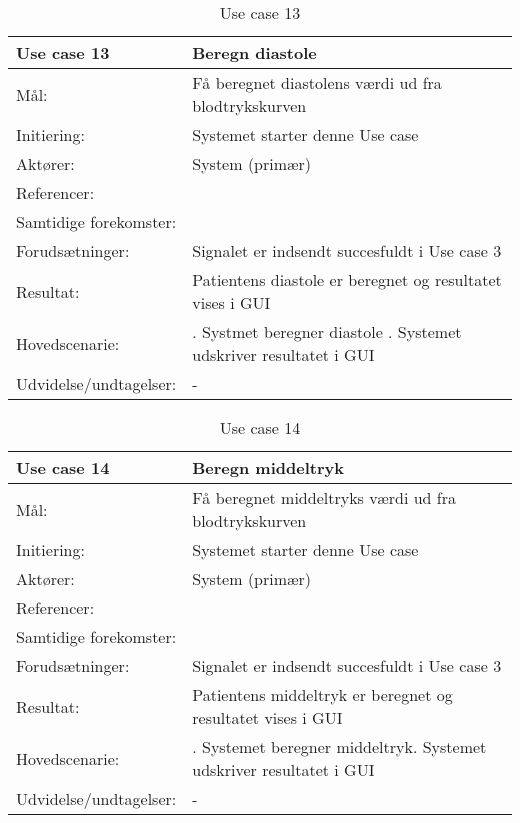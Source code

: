 \begin{table}[h!]
\caption{Use case 13}\label{tab:tabel3}
\begin{tabular}{| l | >{\raggedright\arraybackslash}p{11cm} |}
   \hline
   \textbf{Use case 13} & \textbf{Beregn diastole}\\ \hline
   Mål: & Få beregnet diastolens værdi ud fra blodtrykskurven \\ \hline
   Initiering: & Systemet starter denne Use case\\ \hline
   Aktører:& System (primær)\\ \hline
   Referencer: & \\ \hline
   Samtidige forekomster: & \\\hline
   Forudsætninger: & Signalet er indsendt succesfuldt i Use case 3 \\ \hline
   Resultat:& Patientens diastole er beregnet og resultatet vises i GUI\\ \hline
   Hovedscenarie:& 
1. Systmet beregner diastole \newline
2. Systemet udskriver resultatet i GUI \\\hline
Udvidelse/undtagelser: & -\\\hline
\end{tabular}
\end{table}


\begin{table}[h!]
\caption{Use case 14}\label{tab:tabel3}
\begin{tabular}{| l | >{\raggedright\arraybackslash}p{11cm} |}
   \hline
   \textbf{Use case 14} & \textbf{Beregn middeltryk}\\ \hline
   Mål: & Få beregnet middeltryks værdi ud fra blodtrykskurven \\ \hline
   Initiering: & Systemet starter denne Use case\\ \hline
   Aktører:& System (primær)\\ \hline
   Referencer: & \\ \hline
   Samtidige forekomster: & \\\hline
   Forudsætninger: & Signalet er indsendt succesfuldt i Use case 3 \\ \hline
   Resultat:& Patientens middeltryk er beregnet og resultatet vises i GUI\\ \hline
   Hovedscenarie:& 
1. Systemet beregner middeltryk\newline
2. Systemet udskriver resultatet i GUI \\\hline
Udvidelse/undtagelser: & -\\\hline
\end{tabular}
\end{table}


